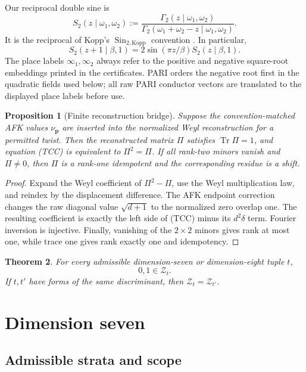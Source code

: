 \documentclass[11pt]{article}
\newtheorem{theorem}{Theorem}
\newtheorem{proposition}[theorem]{Proposition}
\newcommand{\Tr}{\operatorname{Tr}}
\begin{document}
Our reciprocal double sine is
\[
 S_2(z\mid\omega_1,\omega_2)
 :=\frac{\Gamma_2(z\mid\omega_1,\omega_2)}
 {\Gamma_2(\omega_1+\omega_2-z\mid\omega_1,\omega_2)}.
\tag{1}
\]
It is the reciprocal of Kopp's
$\operatorname{Sin}_{2,\mathrm{Kopp}}$ convention
\cite[Definition~4.22]{Kopp}.  In particular,
\[
 S_2(z+1\mid\beta,1)
 =2\sin(\pi z/\beta)S_2(z\mid\beta,1).
\tag{2}
\]
The place labels $\infty_1,\infty_2$ always refer to the positive and
negative square-root embeddings printed in the certificates.  PARI
orders the negative root first in the quadratic fields used below;
all raw PARI conductor vectors are translated to the displayed place
labels before use.

\begin{proposition}[Finite reconstruction bridge]\label{prop:bridge}
Suppose the convention-matched AFK values
$\nu_{\boldsymbol p}$ are inserted into the normalized Weyl
reconstruction for a permitted twist.  Then the reconstructed matrix
$\Pi$ satisfies $\Tr\Pi=1$, and equation \textup{(TCC)} is equivalent
to $\Pi^2=\Pi$.  If all rank-two minors vanish and $\Pi\ne0$, then
$\Pi$ is a rank-one idempotent and the corresponding residue is a
shift.
\end{proposition}

\begin{proof}
Expand the Weyl coefficient of $\Pi^2-\Pi$, use the Weyl multiplication
law, and reindex by the displacement difference.  The AFK endpoint
correction changes the raw diagonal value
$\sqrt{d+1}$ to the normalized zero overlap one.  The resulting
coefficient is exactly the left side of \textup{(TCC)} minus its
$d^2\delta$ term.  Fourier inversion is injective.  Finally, vanishing
of the $2\times2$ minors gives rank at most one, while trace one gives
rank exactly one and idempotency.
\end{proof}

\begin{theorem}\label{thm:main}
For every admissible dimension-seven or dimension-eight tuple $t$,
\[
 0,1\in\mathcal Z_t.
\]
If $t,t'$ have forms of the same discriminant, then
$\mathcal Z_t=\mathcal Z_{t'}$.
\end{theorem}

\section{Dimension seven}\label{sec:d7}

\subsection{Admissible strata and scope}
\end{document}
